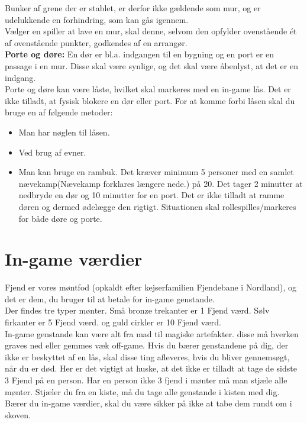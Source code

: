 Bunker af grene der er stablet, er derfor ikke gældende som mur, og er udelukkende en forhindring, som kan gås igennem.\\
Vælger en spiller at lave en mur, skal denne, selvom den opfylder ovenstående ét af ovenstående punkter, godkendes af en arrangør.\\
\textbf{Porte og døre:} En dør er bl.a. indgangen til en bygning og en port er en passage i en mur. Disse skal være synlige, og det skal være åbenlyst, at det er en indgang.\\
Porte og døre kan være låste, hvilket skal markeres med en in-game lås. Det er ikke tilladt, at fysisk blokere en dør eller port. For at komme forbi låsen skal du bruge en af følgende metoder:
\begin{itemize}
    \item Man har nøglen til låsen.
    \item Ved brug af evner.
    \item Man kan bruge en rambuk. Det kræver minimum 5 personer med en samlet nævekamp(Nævekamp forklares længere nede.) på 20. Det tager 2 minutter at nedbryde en dør og 10 minutter for en port. Det er ikke tilladt at ramme døren og dermed ødelægge den rigtigt. Situationen skal rollespilles/markeres for både døre og porte.
\end{itemize}

\section{In-game værdier}
Fjend er vores møntfod (opkaldt efter kejserfamilien Fjendebane i Nordland), og det er dem, du bruger til at betale for in-game genstande.\\
Der findes tre typer mønter. Små bronze trekanter er 1 Fjend værd. Sølv firkanter er 5 Fjend værd. og guld cirkler er 10 Fjend værd.\\
In-game genstande kan være alt fra mad til magiske artefakter. disse må hverken graves ned eller gemmes væk off-game. Hvis du bærer genstandene på dig, der ikke er beskyttet af en lås, skal disse ting afleveres, hvis du bliver gennemsøgt, når du er død. Her er det vigtigt at huske, at det ikke er tilladt at tage de sidste 3 Fjend på en person. Har en person ikke 3 fjend i mønter må man stjæle alle mønter. Stjæler du fra en kiste, må du tage alle genstande i kisten med dig.\\
Bærer du in-game værdier, skal du være sikker på ikke at tabe dem rundt om i skoven.

